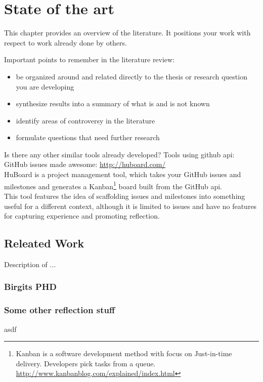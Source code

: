 
\chapter{State of the art}
This chapter provides an overview of the literature. It positions your work with respect to
work already done by others.

Important points to remember in the literature review:
\begin{itemize}
\item be organized around and related directly to the thesis or research question you are developing
\item synthesize results into a summary of what is and is not known
\item identify areas of controversy in the literature
\item formulate questions that need further research
\end{itemize}

Is there any other similar tools already developed? 
Tools using github api: \\
GitHub issues made awesome: \url{http://huboard.com/} \\
HuBoard is a project management tool, which takes your GitHub issues and milestones and generates a Kanban\footnote{Kanban is a software development method with focus on Just-in-time delivery. Developers pick tasks from a queue. \url{http://www.kanbanblog.com/explained/index.html}} board built from the GitHub api. \\
This tool features the idea of scaffolding issues and milestones into something useful for a different context, although it is limited to issues and have no features for capturing experience and promoting reflection. 
\section{Releated Work}
Description of ...

\subsection{Birgits PHD}

\subsection{Some other reflection stuff}
asdf
